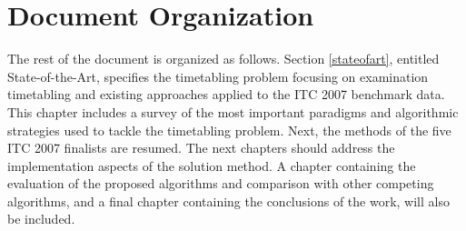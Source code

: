 
\section{Document Organization}

The rest of the document is organized as follows. Section \ref{stateofart}, entitled State-of-the-Art, specifies the timetabling problem focusing on examination timetabling and existing approaches applied to the ITC 2007 benchmark data. This chapter includes a survey of the most important paradigms and algorithmic strategies used to tackle the timetabling problem. Next, the methods of the five ITC 2007 finalists are resumed. The next chapters should address the implementation aspects of the solution method. A chapter containing the evaluation of the proposed algorithms and comparison with other competing algorithms, and a final chapter containing the conclusions of the work, will also be included.